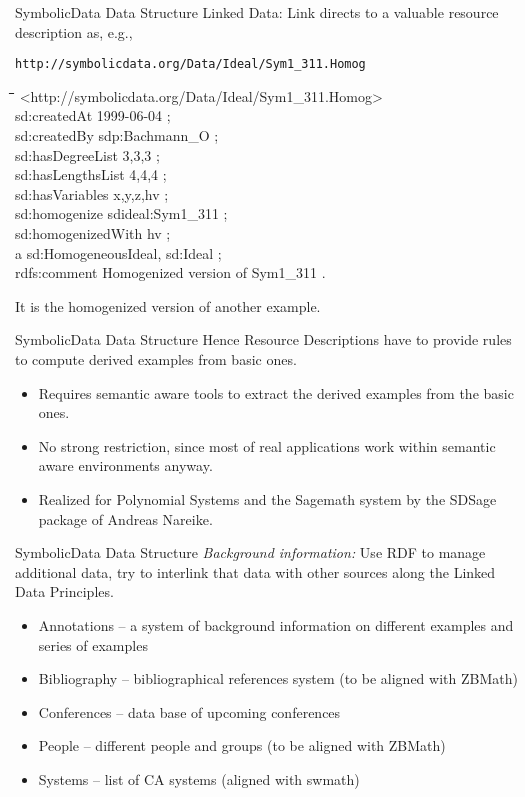 \documentclass{beamer}
\newenvironment{code}{\footnotesize\tt \begin{tabbing}
\hskip12pt\=\hskip12pt\=\hskip12pt\=\hskip12pt\=\hskip5cm\=\hskip5cm\=\kill}
{\end{tabbing}}
\begin{document}
\begin{frame}{SymbolicData Data Structure}{}
Linked Data: Link directs to a valuable resource description as, e.g., 

\texttt{http://symbolicdata.org/Data/Ideal/Sym1\_311.Homog}
\begin{code}
  <http://symbolicdata.org/Data/Ideal/Sym1\_311.Homog> \+\\
  sd:createdAt {\dq}1999-06-04{\dq} ;\\
  sd:createdBy sdp:Bachmann\_O ;\\
  sd:hasDegreeList {\dq}3,3,3{\dq} ;\\
  sd:hasLengthsList {\dq}4,4,4{\dq} ;\\
  sd:hasVariables {\dq}x,y,z,hv{\dq} ;\\
  sd:homogenize sdideal:Sym1\_311 ;\\
  sd:homogenizedWith {\dq}hv{\dq} ;\\
  a sd:HomogeneousIdeal, sd:Ideal ;\\
  rdfs:comment {\dq}Homogenized version of Sym1\_311{\dq} .
\end{code}
It is the homogenized version of another example.
\end{frame}

\begin{frame}{SymbolicData Data Structure}{}
Hence Resource Descriptions have to provide rules to compute derived examples
from basic ones.
\begin{itemize}
\item Requires semantic aware tools to extract the derived examples from the
  basic ones.
\item No strong restriction, since most of real applications work within
  semantic aware environments anyway.
\item Realized for Polynomial Systems and the Sagemath system by the SDSage
  package of Andreas Nareike.
\end{itemize}
\end{frame}

\begin{frame}{SymbolicData Data Structure}{}
\emph{Background information:} Use RDF to manage additional data, try to
interlink that data with other sources along the Linked Data Principles.
\begin{itemize}
\item Annotations -- a system of background information on different examples
  and series of examples
\item Bibliography -- bibliographical references system (to be aligned with
  ZBMath)
\item Conferences -- data base of upcoming conferences
\item People -- different people and groups (to be aligned with ZBMath)
\item Systems -- list of CA systems (aligned with swmath) 
\end{itemize}
\end{frame}
\end{document}
